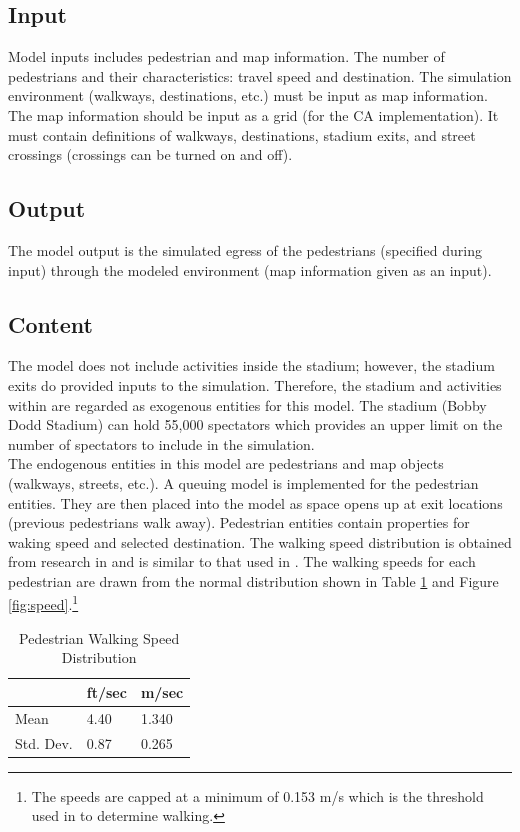 \documentclass[paper=a4, fontsize=11pt]{scrartcl}
\numberwithin{equation}{section}		%
\numberwithin{figure}{section}			%
\numberwithin{table}{section}		    %
\begin{document}
\subsection{Input} \label{sec:model_in}
Model inputs includes pedestrian and map information. The number of pedestrians and their 
characteristics: travel speed and destination. The simulation environment (walkways, destinations, 
etc.) must be input as map information. The map information should be input as a grid (for the CA 
implementation). It must contain definitions of walkways, destinations, stadium exits, and street 
crossings (crossings can be turned on and off).
	
\subsection{Output} \label{sec:model_out}
The model output is the simulated egress of the pedestrians (specified during input) through the 
modeled environment (map information given as an input).	

\subsection{Content} \label{sec:model_cont}
The model does not include activities inside the stadium; however, the stadium exits do 
provided inputs to the simulation. Therefore, the stadium and activities within are regarded as 
exogenous entities for this model. The stadium (Bobby Dodd Stadium) can hold 55,000 spectators 
\cite{Dodd:Misc} which provides an upper limit on the number of spectators to include in the 
simulation. \\

\noindent
The endogenous entities in this model are pedestrians and map objects (walkways, streets, 
etc.). A queuing model is implemented for the pedestrian entities. They are then placed into the 
model as space opens up at exit locations (previous pedestrians walk away). Pedestrian entities 
contain properties for waking speed and selected destination. The walking speed distribution is 
obtained from research in \cite{young1999evaluation} and is similar to that used in 
\cite{burstedde2001simulation}. The walking speeds for each pedestrian are drawn from the normal 
distribution shown in Table \ref{tbl:01} and Figure \ref{fig:speed}.\footnote{The speeds are capped 
at a minimum of 0.153 m/s which is the threshold used in \cite{young1999evaluation}to determine 
walking.}
	
\begin{table}[H]
	\centering
	\caption{Pedestrian Walking Speed Distribution \cite{young1999evaluation}}
	\label{tbl:01}
	\begin{tabular}{l|ll}
		& ft/sec & m/sec \\ \hline
		Mean      & 4.40   & 1.340 \\
		Std. Dev. & 0.87   & 0.265
	\end{tabular}
\end{table}
\end{document}
